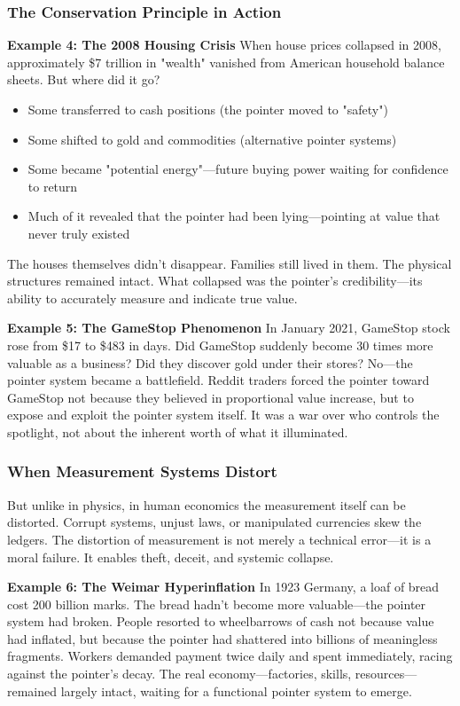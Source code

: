 \documentclass[11pt,oneside]{book}
\begin{document}
\subsubsection{The Conservation Principle in Action}

\textbf{Example 4: The 2008 Housing Crisis}
When house prices collapsed in 2008, approximately \$7 trillion in "wealth" vanished from American household balance sheets. But where did it go?
\begin{itemize}
\item Some transferred to cash positions (the pointer moved to "safety")
\item Some shifted to gold and commodities (alternative pointer systems)
\item Some became "potential energy"—future buying power waiting for confidence to return
\item Much of it revealed that the pointer had been lying—pointing at value that never truly existed
\end{itemize}

The houses themselves didn't disappear. Families still lived in them. The physical structures remained intact. What collapsed was the pointer's credibility—its ability to accurately measure and indicate true value.

\textbf{Example 5: The GameStop Phenomenon}
In January 2021, GameStop stock rose from \$17 to \$483 in days. Did GameStop suddenly become 30 times more valuable as a business? Did they discover gold under their stores? No—the pointer system became a battlefield. Reddit traders forced the pointer toward GameStop not because they believed in proportional value increase, but to expose and exploit the pointer system itself. It was a war over who controls the spotlight, not about the inherent worth of what it illuminated.

\subsubsection{When Measurement Systems Distort}

But unlike in physics, in human economics the measurement itself can be distorted. Corrupt systems, unjust laws, or manipulated currencies skew the ledgers. The distortion of measurement is not merely a technical error—it is a moral failure. It enables theft, deceit, and systemic collapse.

\textbf{Example 6: The Weimar Hyperinflation}
In 1923 Germany, a loaf of bread cost 200 billion marks. The bread hadn't become more valuable—the pointer system had broken. People resorted to wheelbarrows of cash not because value had inflated, but because the pointer had shattered into billions of meaningless fragments. Workers demanded payment twice daily and spent immediately, racing against the pointer's decay. The real economy—factories, skills, resources—remained largely intact, waiting for a functional pointer system to emerge.
\end{document}
